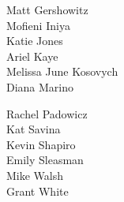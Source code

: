 \documentclass{article}[10pt]
\begin{document}
\begin{center}
{\begin{multicols*}{3}
\begin{center}
\begin{small}
{Matt Gershowitz}\\
{Mofieni Iniya}\\
{Katie Jones}\\
{Ariel Kaye}\\
{Melissa June Kosovych}\\
{Diana Marino}\vfill\null
\columnbreak

{Rachel Padowicz}\\
{Kat Savina}\\
{Kevin Shapiro}\\
{Emily Sleasman}\\
{Mike Walsh}\\
{Grant White}
                    \end{small}
                \end{center}
            \end{multicols*}
        }
    \end{center}

    \pagebreak

\end{document}
